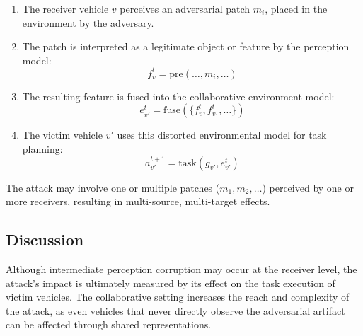 \begin{enumerate}
    \item The receiver vehicle \( v \) perceives an adversarial patch \( m_i \), placed in the environment by the adversary.
    \item The patch is interpreted as a legitimate object or feature by the perception model:
    \[
    f_v^t = \text{pre}(\dots, m_i, \dots)
    \]
    \item The resulting feature is fused into the collaborative environment model:
    \[
    e_{v'}^t = \text{fuse}(\{f_v^t, f_{v_1}^t, \dots\})
    \]
    \item The victim vehicle \( v' \) uses this distorted environmental model for task planning:
    \[
    a_{v'}^{t+1} = \text{task}(g_{v'}, e_{v'}^t)
    \]
\end{enumerate}

The attack may involve one or multiple patches (\( m_1, m_2, \dots \)) perceived by one or more receivers, resulting in multi-source, multi-target effects.

\subsection{Discussion}

Although intermediate perception corruption may occur at the receiver level, the attack's impact is ultimately measured by its effect on the task execution of victim vehicles. The collaborative setting increases the reach and complexity of the attack, as even vehicles that never directly observe the adversarial artifact can be affected through shared representations.
